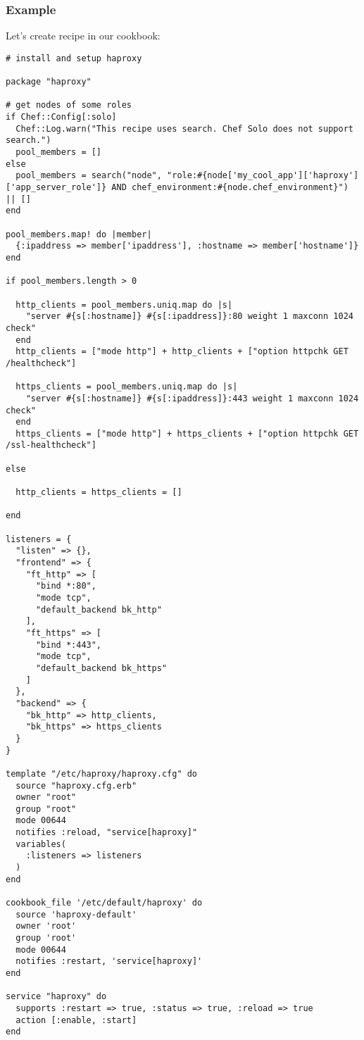 \subsubsection{Example}

Let's create recipe  in our cookbook:

\begin{lstlisting}[label=lst:testing-chef-zero12]
# install and setup haproxy

package "haproxy"

# get nodes of some roles
if Chef::Config[:solo]
  Chef::Log.warn("This recipe uses search. Chef Solo does not support search.")
  pool_members = []
else
  pool_members = search("node", "role:#{node['my_cool_app']['haproxy']['app_server_role']} AND chef_environment:#{node.chef_environment}") || []
end

pool_members.map! do |member|
  {:ipaddress => member['ipaddress'], :hostname => member['hostname']}
end

if pool_members.length > 0

  http_clients = pool_members.uniq.map do |s|
    "server #{s[:hostname]} #{s[:ipaddress]}:80 weight 1 maxconn 1024 check"
  end
  http_clients = ["mode http"] + http_clients + ["option httpchk GET /healthcheck"]

  https_clients = pool_members.uniq.map do |s|
    "server #{s[:hostname]} #{s[:ipaddress]}:443 weight 1 maxconn 1024 check"
  end
  https_clients = ["mode http"] + https_clients + ["option httpchk GET /ssl-healthcheck"]

else

  http_clients = https_clients = []

end

listeners = {
  "listen" => {},
  "frontend" => {
    "ft_http" => [
      "bind *:80",
      "mode tcp",
      "default_backend bk_http"
    ],
    "ft_https" => [
      "bind *:443",
      "mode tcp",
      "default_backend bk_https"
    ]
  },
  "backend" => {
    "bk_http" => http_clients,
    "bk_https" => https_clients
  }
}

template "/etc/haproxy/haproxy.cfg" do
  source "haproxy.cfg.erb"
  owner "root"
  group "root"
  mode 00644
  notifies :reload, "service[haproxy]"
  variables(
    :listeners => listeners
  )
end

cookbook_file '/etc/default/haproxy' do
  source 'haproxy-default'
  owner 'root'
  group 'root'
  mode 00644
  notifies :restart, 'service[haproxy]'
end

service "haproxy" do
  supports :restart => true, :status => true, :reload => true
  action [:enable, :start]
end
\end{lstlisting}

